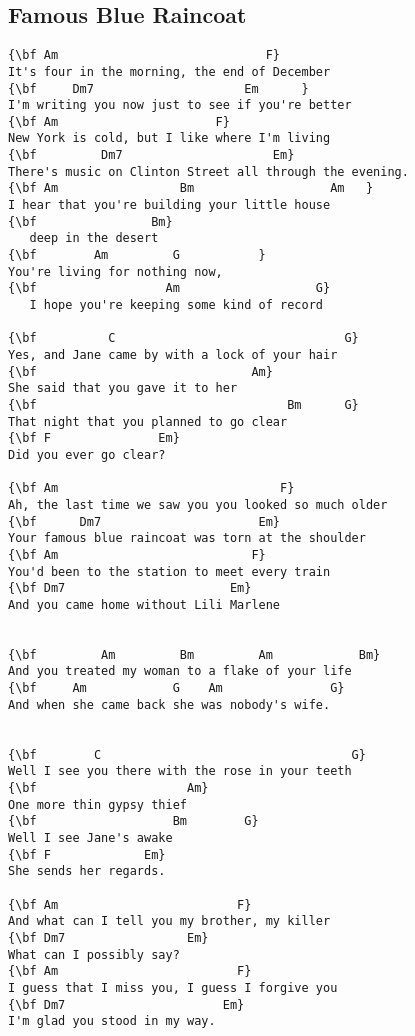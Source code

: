\documentclass[a4paper]{article}
\begin{document}
\subsection{Famous Blue Raincoat} %
\label{sub:Famous Blue Rainco}
\begin{Verbatim}[commandchars=\\\{\}]
{\bf Am                             F}
It's four in the morning, the end of December
{\bf     Dm7                     Em      }
I'm writing you now just to see if you're better
{\bf Am                      F}
New York is cold, but I like where I'm living
{\bf         Dm7                     Em}
There's music on Clinton Street all through the evening.
{\bf Am                 Bm                   Am   }
I hear that you're building your little house
{\bf                Bm}
   deep in the desert
{\bf        Am         G           }
You're living for nothing now,
{\bf                  Am                   G}
   I hope you're keeping some kind of record

{\bf          C                                G}
Yes, and Jane came by with a lock of your hair
{\bf                              Am}
She said that you gave it to her
{\bf                                   Bm      G}
That night that you planned to go clear
{\bf F               Em}
Did you ever go clear?

{\bf Am                               F}
Ah, the last time we saw you you looked so much older
{\bf      Dm7                      Em}
Your famous blue raincoat was torn at the shoulder
{\bf Am                           F}
You'd been to the station to meet every train
{\bf Dm7                       Em}
And you came home without Lili Marlene


{\bf         Am         Bm         Am            Bm}
And you treated my woman to a flake of your life
{\bf     Am            G    Am               G}
And when she came back she was nobody's wife.


{\bf        C                                   G}
Well I see you there with the rose in your teeth
{\bf                     Am}
One more thin gypsy thief
{\bf                   Bm        G}
Well I see Jane's awake
{\bf F             Em}
She sends her regards.

{\bf Am                         F}
And what can I tell you my brother, my killer
{\bf Dm7                 Em}
What can I possibly say?
{\bf Am                         F}
I guess that I miss you, I guess I forgive you
{\bf Dm7                      Em}
I'm glad you stood in my way.


\end{Verbatim}
\end{document}
